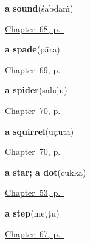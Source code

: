 \noindent\begin{minipage}[t]{\linewidth}
\raggedright
\textbf{a sound}\enspace\emph{}\enspace(śabdaṁ)\par
\footnotesize \hyperref[ch:te-sound-and-voice]{Chapter~68, p.~\pageref*{ch:te-sound-and-voice}}
\end{minipage}\par\smallskip

\noindent\begin{minipage}[t]{\linewidth}
\raggedright
\textbf{a spade}\enspace\emph{}\enspace(pāra)\par
\footnotesize \hyperref[ch:te-tools]{Chapter~69, p.~\pageref*{ch:te-tools}}
\end{minipage}\par\smallskip

\noindent\begin{minipage}[t]{\linewidth}
\raggedright
\textbf{a spider}\enspace\emph{}\enspace(sālīḍu)\par
\footnotesize \hyperref[ch:te-small-creatures]{Chapter~70, p.~\pageref*{ch:te-small-creatures}}
\end{minipage}\par\smallskip

\noindent\begin{minipage}[t]{\linewidth}
\raggedright
\textbf{a squirrel}\enspace\emph{}\enspace(uḍuta)\par
\footnotesize \hyperref[ch:te-small-creatures]{Chapter~70, p.~\pageref*{ch:te-small-creatures}}
\end{minipage}\par\smallskip

\noindent\begin{minipage}[t]{\linewidth}
\raggedright
\textbf{a star; a dot}\enspace\emph{}\enspace(cukka)\par
\footnotesize \hyperref[ch:te-sky]{Chapter~53, p.~\pageref*{ch:te-sky}}
\end{minipage}\par\smallskip

\noindent\begin{minipage}[t]{\linewidth}
\raggedright
\textbf{a step}\enspace\emph{}\enspace(meṭṭu)\par
\footnotesize \hyperref[ch:te-the-house-itself]{Chapter~67, p.~\pageref*{ch:te-the-house-itself}}
\end{minipage}\par\smallskip

